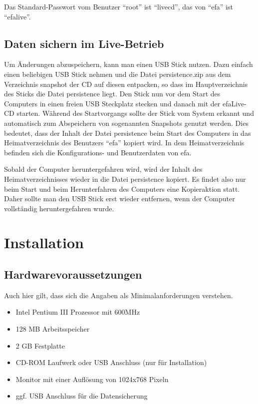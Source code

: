 \documentclass[a4paper,12pt,twoside]{article}
\begin{document}
Das Standard-Passwort vom Benutzer "`root"' ist "`livecd"', das von
"`efa"' ist "`efalive"'.


\subsection{Daten sichern im Live-Betrieb}
\label{sct:live_sichern}
Um Änderungen abzuspeichern, kann man einen USB Stick nutzen. Dazu
einfach einen beliebigen USB Stick nehmen und die Datei persistence.zip
aus dem Verzeichnis snapshot der CD auf diesen entpacken, so dass im
Hauptverzeichnis des Sticks die Datei persistence liegt. Den Stick nun
vor dem Start des Computers in einen freien USB Steckplatz stecken und
danach mit der efaLive-CD starten. Während des Startvorgangs sollte der
Stick vom System erkannt und automatisch zum Abspeichern von
sogenannten Snapshots genutzt werden. Dies bedeutet, dass der Inhalt
der Datei persistence beim Start des Computers in das Heimatverzeichnis
des Benutzers "`efa"' kopiert wird. In dem
Heimatverzeichnis befinden sich die Konfigurations- und Benutzerdaten
von efa. 

Sobald der Computer heruntergefahren wird, wird der Inhalt des
Heimatverzeichnisses wieder in die Datei persistence kopiert. Es findet
also nur beim Start und beim Herunterfahren des Computers eine
Kopieraktion statt. Daher sollte man den USB Stick erst wieder
entfernen, wenn der Computer vollständig heruntergefahren wurde.


\section{Installation}
\label{sct:installation}
\subsection{Hardwarevoraussetzungen}
\label{sct:inst_hardware}
Auch hier gilt, dass sich die Angaben als Minimalanforderungen
verstehen.

\begin{itemize}
    \item Intel Pentium III Prozessor mit 600MHz
    \item 128 MB Arbeitsspeicher
    \item 2 GB Festplatte
    \item CD-ROM Laufwerk oder USB Anschluss (nur für Installation)
    \item Monitor mit einer Auflösung von 1024x768 Pixeln
    \item ggf. USB Anschluss für die Datensicherung
\end{itemize}
\end{document}

